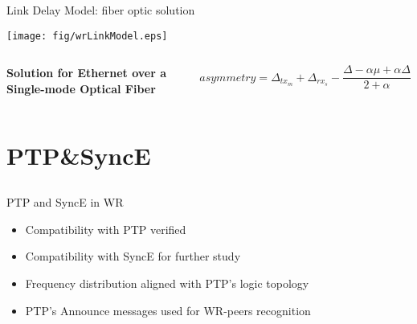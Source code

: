 \documentclass[compress,red]{beamer}
\begin{document}
\begin{frame}{Link Delay Model: fiber optic solution}

  \begin{center}
  \texttt{[image: fig/wrLinkModel.eps]}
  \end{center}

  \begin{columns}[c]
  \column{1.5in}

    \begin{center}
      \textbf{Solution for Ethernet over a Single-mode Optical Fiber}
    \end{center}    

  \column{2.7in}

    \begin{equation}
      \nonumber asymmetry = \Delta_{tx_m} + \Delta_{rx_s} - \frac{\Delta - \alpha \mu + \alpha \Delta}{2 + \alpha}
    \end{equation}

  \end{columns}

\end{frame}
\section{PTP\&SyncE}
\subsection{}
\begin{frame}{PTP and SyncE in WR}

  \begin{itemize}
    \item Compatibility with PTP verified
    \item Compatibility with SyncE for further study
    \item Frequency distribution aligned with PTP's logic topology
    \item PTP's Announce messages used for WR-peers recognition
  \end{itemize}

\end{frame}
\end{document}
